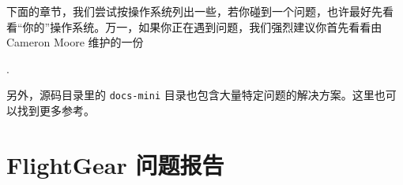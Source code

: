 \ifchinese
下面的章节，我们尝试按操作系统列出一些，若你碰到一个问题，也许最好先看看“你的”操作系统。万一，如果你正在遇到问题，我们强烈建议你首先看看由 Cameron Moore 维护的一份 
\fi
\iffalse
\IfLanguageName{english}{
In the following section, we tried to sort some \Index{problems} according to operating system,
but if you encounter a problem, it may be a wise idea to look beyond ``your'' operating system -- just in case. If you are experiencing problems, we would strongly advise you to first check the \Index{FAQ} maintained by Cameron Moore\index{Moore Cameron} at
}{}
\IfLanguageName{french}{
Dans la section suivante, nous avons essay\'{e} de trier quelques \Index{probl\`{e}mes} qui peuvent \^{e}tre rencontr\'{e}s, en fonction des syst\`{e}mes d'exploitation. Cependant, si jamais vous rencontrez un probl\`{e}me, sachez qu'il peut parfois \^{e}tre une bonne id\'{e}e de regarder plus loin que ``votre'' syst\`{e}me d'exploitation - au cas o\`{u}. Si vous rencontrez des difficult\'{e}s, nous vous recommandons vivement de consulter en premier lieu la \Index{FAQ} maintenue par Cameron Moore\index{Moore Cameron} \`{a} l'adresse suivante :
}{}
\fi

\medskip

.
\medskip

\ifchinese
另外，源码目录里的 \texttt{docs-mini} 目录也包含大量特定问题的解决方案。这里也可以找到更多参考。
\fi
\iffalse
\IfLanguageName{english}{
Moreover, the source code contains a directory \texttt{docs-mini} containing numerous
ideas on and solutions to special problems. This is also a good place to go for further reading.
}{}
\IfLanguageName{french}{
De plus, le code source comporte un r\'{e}pertoire \texttt{docs-mini} qui contient de nombreuses id\'{e}es
et solutions pour des probl\`{e}mes sp\'{e}cifiques. Il s'agit donc \'{e}galement d'un bon endroit pour trouver d'avantage d'informations.
}{}
\fi
\ifchinese
\section{FlightGear 问题报告}
\fi
\iffalse
\IfLanguageName{english}{
\section{FlightGear Problem Reports}\index{problem report}
}{}
\IfLanguageName{french}{
\section{Signaler des probl\`{e}mes relatifs \`{a} FlightGear}\index{signaler un probl\`{e}me}
}{}
\fi

